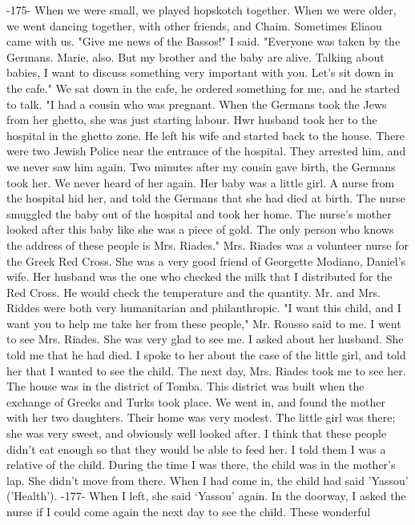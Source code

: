 -175- 
When we were small, we played hopskotch together. When we were older, 
we went dancing together, with other friends, and Chaim. Sometimes 
Eliaou came with us. 
"Give me news of the Bassos!" I said. 
"Everyone was taken by the Germans. Marie, also. But my brother 
and the baby are alive. Talking about babies, I want to discuss something very important with you. Let's sit down in the cafe." 
We sat down in the cafe, he ordered something for me, and he started to 
talk. "I had a cousin who was pregnant. When the Germans took the 
Jews from her ghetto, she was just starting labour. Hwr husband took 
her to the hospital in the ghetto zone. He left his wife and started 
back to the house. There were two Jewish Police near the entrance of 
the hospital. They arrested him, and we never saw him again. Two minutes after my cousin gave birth, the Germans took her. We never heard 
of her again. Her baby was a little girl. A nurse from the hospital 
hid her, and told the Germans that she had died at birth. The nurse 
smuggled the baby out of the hospital and took her home. The nurse's 
mother looked after this baby like she was a piece of gold. The only 
person who knows the address of these people is Mrs. Riades." 
Mrs. Riades was a volunteer nurse for the Greek Red Cross. She was 
a very good friend of Georgette Modiano, Daniel's wife. Her husband was 
the one who checked the milk that I distributed for the Red Cross. He 
would check the temperature and the quantity. Mr. and Mrs. Riddes were 
both very humanitarian and philanthropic. 
"I want this child, and I want you to help me take her from these 
people," Mr. Rousso said to me. 
I went to see Mrs. Riades. She was very glad to see me. I asked 
about her husband. She told me that he had died. I spoke to her about 
the case of the little girl, and told her that I wanted to see the 
child. The next day, Mrs. Riades took me to see her. 
The house was in the district of Tomba. This district was built 
when the exchange of Greeks and Turks took place. We went in, and found 
the mother with her two daughters. Their home was very modest. The 
little girl was there; she was very sweet, and obviously well looked after. I think that these people didn't eat enough so that they would be 
able to feed her. I told them I was a relative of the child. During the time I was there, the child was in the mother's lap. She didn't move
from there. When I had come in, the child had said 'Yassou' ('Health'). 
-177- 
When I left, she said ‘Yassou’ again. In the doorway, I asked the nurse 
if I could come again the next day to see the child. These wonderful 

